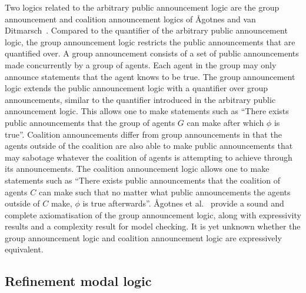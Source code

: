 Two logics related to the arbitrary public announcement logic are the group announcement and coalition announcement logics of {\AA}gotnes and van Ditmarsch~\cite{agotnes:2008,agotnes:2010}. 
Compared to the quantifier of the arbitrary public announcement logic, the group announcement logic restricts the public announcements that are quantified over. 
A group announcement consists of a set of public announcements made concurrently by a group of agents.
Each agent in the group may only announce statements that the agent knows to be true.
The group announcement logic extends the public announcement logic with a quantifier over group announcements, similar to the quantifier introduced in the arbitrary public announcement logic. 
This allows one to make statements such as ``There exists public announcements that the group of agents $G$ can make after which $\phi$ is true''.
Coalition announcements differ from group announcements in that the agents outside of the coalition are also able to make public announcements that may sabotage whatever the coalition of agents is attempting to achieve through its announcements.
The coalition announcement logic allows one to make statements such as ``There exists public announcements that the coalition of agents $C$ can make such that no matter what public announcements the agents outside of $C$ make, $\phi$ is true afterwards''. 
{\AA}gotnes et al.~\cite{agotnes:2010} provide a sound and complete axiomatisation of the group announcement logic, along with expressivity results and a complexity result for model checking.
It is yet unknown whether the group announcement logic and coalition announcement logic are expressively equivalent.


\subsection{Refinement modal logic}

